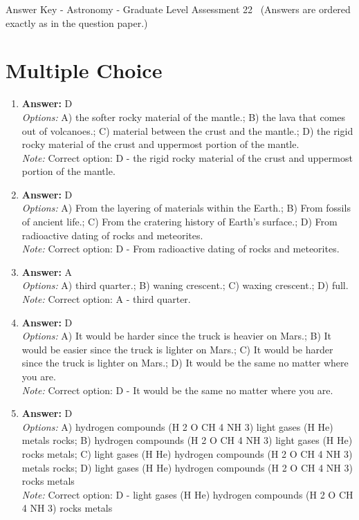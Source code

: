 \documentclass[12pt]{article}
\begin{document}
\begin{center}
Answer Key - Astronomy - Graduate Level Assessment 22 \
\small (Answers are ordered exactly as in the question paper.)
\end{center}

\section*{Multiple Choice}
\begin{enumerate}[label=\arabic*.]
\item \textbf{Answer:} D
\\ \textit{Options:} A) the softer rocky material of the mantle.; B) the lava that comes out of volcanoes.; C) material between the crust and the mantle.; D) the rigid rocky material of the crust and uppermost portion of the mantle.
\\ \textit{Note:} Correct option: D - the rigid rocky material of the crust and uppermost portion of the mantle.
\item \textbf{Answer:} D
\\ \textit{Options:} A) From the layering of materials within the Earth.; B) From fossils of ancient life.; C) From the cratering history of Earth's surface.; D) From radioactive dating of rocks and meteorites.
\\ \textit{Note:} Correct option: D - From radioactive dating of rocks and meteorites.
\item \textbf{Answer:} A
\\ \textit{Options:} A) third quarter.; B) waning crescent.; C) waxing crescent.; D) full.
\\ \textit{Note:} Correct option: A - third quarter.
\item \textbf{Answer:} D
\\ \textit{Options:} A) It would be harder since the truck is heavier on Mars.; B) It would be easier since the truck is lighter on Mars.; C) It would be harder since the truck is lighter on Mars.; D) It would be the same no matter where you are.
\\ \textit{Note:} Correct option: D - It would be the same no matter where you are.
\item \textbf{Answer:} D
\\ \textit{Options:} A) hydrogen compounds (H 2 O CH 4 NH 3) light gases (H He) metals rocks; B) hydrogen compounds (H 2 O CH 4 NH 3) light gases (H He) rocks metals; C) light gases (H He) hydrogen compounds (H 2 O CH 4 NH 3) metals rocks; D) light gases (H He) hydrogen compounds (H 2 O CH 4 NH 3) rocks metals
\\ \textit{Note:} Correct option: D - light gases (H He) hydrogen compounds (H 2 O CH 4 NH 3) rocks metals
\end{enumerate}
\end{document}
